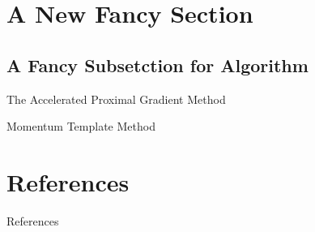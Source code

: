 \documentclass[11pt]{beamer}
\begin{document}
    
\section{A New Fancy Section}
    \subsection{A Fancy Subsetction for Algorithm}
        \begin{frame}{The Accelerated Proximal Gradient Method}
            \begin{block}{Momentum Template Method}
                \begin{algorithm}[H]
                    \begin{algorithmic}[1]
                        \ENDFOR
                    \end{algorithmic}
                    \caption{Template Proximal Gradient Method With Momentum}\label{alg:fista_template}
                \end{algorithm}
            \end{block}
        \end{frame}


    
        
    
\section{References}
    \begin{frame}{References}
        
        
    \end{frame}
\end{document}
